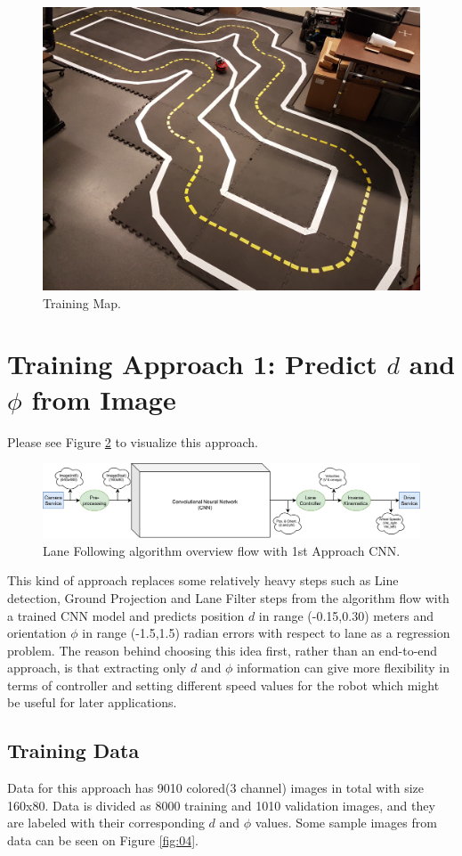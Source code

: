 \documentclass[11pt,letterpaper]{article}
\begin{document}
	\begin{figure}[h!]
		\centering
		\includegraphics[width=0.7\linewidth]{map.jpg}
		\caption{Training Map.}
		\label{fig:02}
	\end{figure}
	
	\section{Training Approach 1: Predict $d$ and $\phi$ from Image}
	Please see Figure \ref{fig:03} to visualize this approach.  
	
	\begin{figure}[h!]
		\centering
		\includegraphics[width=1.1\linewidth]{algo1.png}
		\caption{Lane Following algorithm overview flow with 1st Approach CNN.}
		\label{fig:03}
	\end{figure}
	
	This kind of approach replaces some relatively heavy steps such as Line detection, Ground Projection and Lane Filter steps from the algorithm flow with a trained CNN model and predicts position $d$ in range (-0.15,0.30) meters and orientation $\phi$ in range (-1.5,1.5) radian errors with respect to lane as a regression problem. The reason behind choosing this idea first, rather than an end-to-end approach, is that extracting only $d$ and $\phi$ information can give more flexibility in terms of controller and setting different speed values for the robot which might be useful for later applications.
	
	\subsection{Training Data}
	Data for this approach has 9010 colored(3 channel) images in total with size 160x80. Data is divided as 8000 training and 1010 validation images, and they are labeled with their corresponding $d$ and $\phi$ values. Some sample images from data can be seen on Figure \ref{fig:04}.   
	
\end{document}
